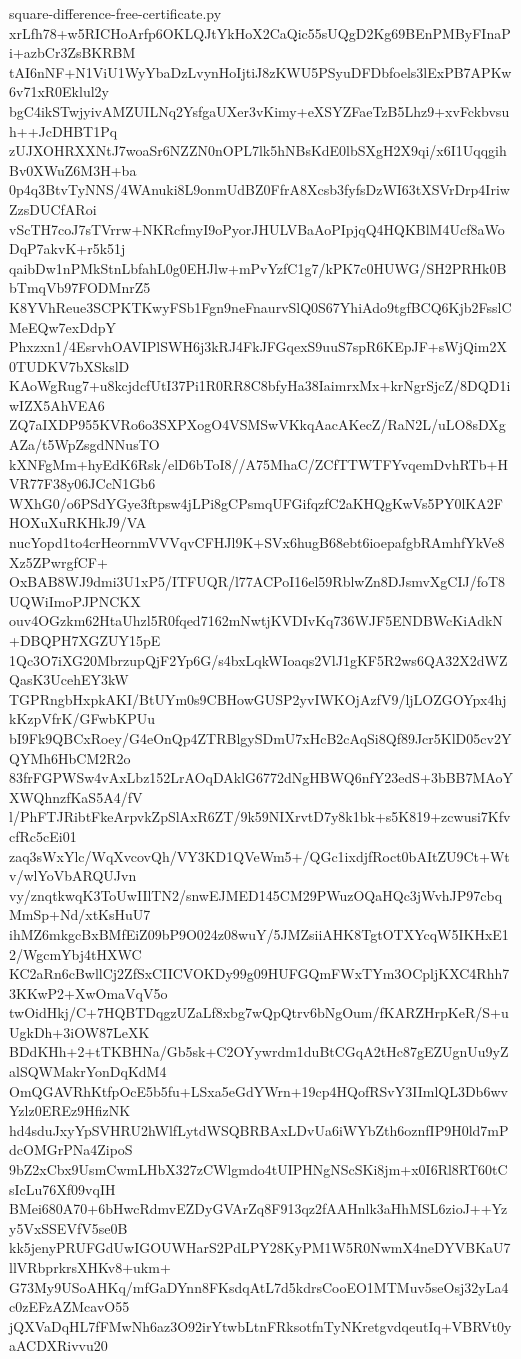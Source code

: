 \documentclass[11pt]{article}
\theoremstyle{definition}
\theoremstyle{remark}
\begin{document}
\begin{filecontents*}[overwrite]{square-difference-free-certificate.py}
xrLfh78+w5RICHoArfp6OKLQJtYkHoX2CaQic55sUQgD2Kg69BEnPMByFInaPi+azbCr3ZsBKRBM
tAI6nNF+N1ViU1WyYbaDzLvynHoIjtiJ8zKWU5PSyuDFDbfoels3lExPB7APKw6v71xR0Eklul2y
bgC4ikSTwjyivAMZUILNq2YsfgaUXer3vKimy+eXSYZFaeTzB5Lhz9+xvFckbvsuh++JcDHBT1Pq
zUJXOHRXXNtJ7woaSr6NZZN0nOPL7lk5hNBsKdE0lbSXgH2X9qi/x6I1UqqgihBv0XWuZ6M3H+ba
0p4q3BtvTyNNS/4WAnuki8L9onmUdBZ0FfrA8Xcsb3fyfsDzWI63tXSVrDrp4IriwZzsDUCfARoi
vScTH7coJ7sTVrrw+NKRcfmyI9oPyorJHULVBaAoPIpjqQ4HQKBlM4Ucf8aWoDqP7akvK+r5k51j
qaibDw1nPMkStnLbfahL0g0EHJlw+mPvYzfC1g7/kPK7c0HUWG/SH2PRHk0BbTmqVb97FODMnrZ5
K8YVhReue3SCPKTKwyFSb1Fgn9neFnaurvSlQ0S67YhiAdo9tgfBCQ6Kjb2FsslCMeEQw7exDdpY
Phxzxn1/4EsrvhOAVIPlSWH6j3kRJ4FkJFGqexS9uuS7spR6KEpJF+sWjQim2X0TUDKV7bXSkslD
KAoWgRug7+u8kcjdcfUtI37Pi1R0RR8C8bfyHa38IaimrxMx+krNgrSjcZ/8DQD1iwIZX5AhVEA6
ZQ7aIXDP955KVRo6o3SXPXogO4VSMSwVKkqAacAKecZ/RaN2L/uLO8sDXgAZa/t5WpZsgdNNusTO
kXNFgMm+hyEdK6Rsk/elD6bToI8//A75MhaC/ZCfTTWTFYvqemDvhRTb+HVR77F38y06JCcN1Gb6
WXhG0/o6PSdYGye3ftpsw4jLPi8gCPsmqUFGifqzfC2aKHQgKwVs5PY0lKA2FHOXuXuRKHkJ9/VA
nucYopd1to4crHeornmVVVqvCFHJl9K+SVx6hugB68ebt6ioepafgbRAmhfYkVe8Xz5ZPwrgfCF+
OxBAB8WJ9dmi3U1xP5/ITFUQR/l77ACPoI16el59RblwZn8DJsmvXgCIJ/foT8UQWiImoPJPNCKX
ouv4OGzkm62HtaUhzl5R0fqed7162mNwtjKVDIvKq736WJF5ENDBWcKiAdkN+DBQPH7XGZUY15pE
1Qc3O7iXG20MbrzupQjF2Yp6G/s4bxLqkWIoaqs2VlJ1gKF5R2ws6QA32X2dWZQasK3UcehEY3kW
TGPRngbHxpkAKI/BtUYm0s9CBHowGUSP2yvIWKOjAzfV9/ljLOZGOYpx4hjkKzpVfrK/GFwbKPUu
bI9Fk9QBCxRoey/G4eOnQp4ZTRBlgySDmU7xHcB2cAqSi8Qf89Jcr5KlD05cv2YQYMh6HbCM2R2o
83frFGPWSw4vAxLbz152LrAOqDAklG6772dNgHBWQ6nfY23edS+3bBB7MAoYXWQhnzfKaS5A4/fV
l/PhFTJRibtFkeArpvkZpSlAxR6ZT/9k59NIXrvtD7y8k1bk+s5K819+zcwusi7KfvcfRc5cEi01
zaq3sWxYlc/WqXvcovQh/VY3KD1QVeWm5+/QGc1ixdjfRoct0bAItZU9Ct+Wtv/wlYoVbARQUJvn
vy/znqtkwqK3ToUwIIlTN2/snwEJMED145CM29PWuzOQaHQc3jWvhJP97cbqMmSp+Nd/xtKsHuU7
ihMZ6mkgcBxBMfEiZ09bP9O024z08wuY/5JMZsiiAHK8TgtOTXYcqW5IKHxE12/WgcmYbj4tHXWC
KC2aRn6cBwllCj2ZfSxCIICVOKDy99g09HUFGQmFWxTYm3OCpljKXC4Rhh73KKwP2+XwOmaVqV5o
twOidHkj/C+7HQBTDqgzUZaLf8xbg7wQpQtrv6bNgOum/fKARZHrpKeR/S+uUgkDh+3iOW87LeXK
BDdKHh+2+tTKBHNa/Gb5sk+C2OYywrdm1duBtCGqA2tHc87gEZUgnUu9yZalSQWMakrYonDqKdM4
OmQGAVRhKtfpOcE5b5fu+LSxa5eGdYWrn+19cp4HQofRSvY3IImlQL3Db6wvYzlz0EREz9HfizNK
hd4sduJxyYpSVHRU2hWlfLytdWSQBRBAxLDvUa6iWYbZth6oznfIP9H0ld7mPdcOMGrPNa4ZipoS
9bZ2xCbx9UsmCwmLHbX327zCWlgmdo4tUIPHNgNScSKi8jm+x0I6Rl8RT60tCsIcLu76Xf09vqIH
BMei680A70+6bHwcRdmvEZDyGVArZq8F913qz2fAAHnlk3aHhMSL6zioJ++Yzy5VxSSEVfV5se0B
kk5jenyPRUFGdUwIGOUWHarS2PdLPY28KyPM1W5R0NwmX4neDYVBKaU7llVRbprkrsXHKv8+ukm+
G73My9USoAHKq/mfGaDYnn8FKsdqAtL7d5kdrsCooEO1MTMuv5seOsj32yLa4c0zEFzAZMcavO55
jQXVaDqHL7fFMwNh6az3O92irYtwbLtnFRksotfnTyNKretgvdqeutIq+VBRVt0yaACDXRivvu20

\end{filecontents*}
\end{document}
